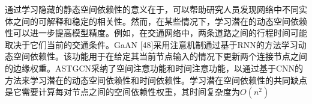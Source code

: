 通过学习隐藏的静态空间依赖性的意义在于，可以帮助研究人员发现网络中不同实体之间的可解释和稳定的相关性。然而，在某些情况下，学习潜在的动态空间依赖性可以进一步提高模型精度。例如，在交通网络中，两条道路之间的行程时间可能取决于它们当前的交通条件。GaAN [48]采用注意机制通过基于RNN的方法学习动态空间依赖性。该功能用于在给定其当前节点输入的情况下更新两个连接节点之间的边缘权重。ASTGCN\cite{guo2019attention}采纳了空间注意功能和时间注意功能，以通过基于CNN的方法来学习潜在的动态空间依赖性和时间依赖性。学习潜在空间依赖性的共同缺点是它需要计算每对节点之间的空间依赖性权重，其时间复杂度为$O(n^2)$






